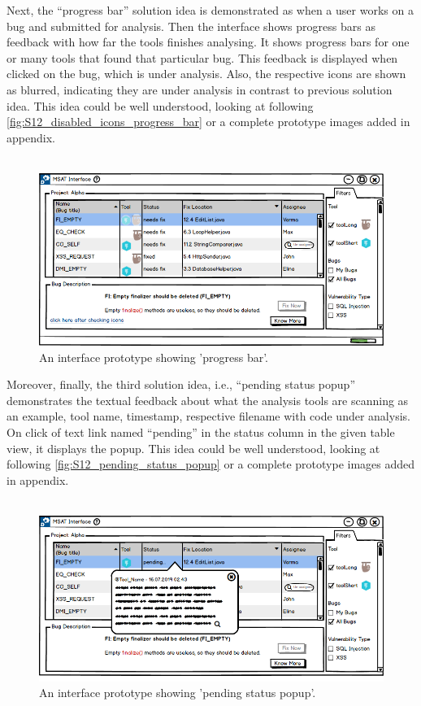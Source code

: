Next, the “progress bar” solution idea is demonstrated as when a user works on a  bug and submitted for analysis.  Then the interface shows progress bars as feedback with how far the tools finishes analysing. It shows progress bars for one or many tools that found that particular bug. This feedback is displayed when clicked on the bug, which is under analysis. Also, the respective icons are shown as blurred, indicating they are under analysis in contrast to previous solution idea. This idea could be well understood, looking at following \autoref{fig:S12_disabled_icons_progress_bar} or a complete prototype images added in appendix. \\ \\


\begin{figure}[hbt!]
	\centering
	\includegraphics[width=\linewidth]{figures/solution_ideas_snaps/S12_disabled_icons_progress_bar}
	\caption{An interface prototype showing 'progress bar'.}
	\label{fig:S12_disabled_icons_progress_bar}
\end{figure}


Moreover, finally, the third solution idea, i.e., “pending status popup” demonstrates the textual feedback about what the analysis tools are scanning as an example, tool name, timestamp, respective filename with code under analysis. On click of text link named “pending” in the status column in the given table view, it displays the popup. This idea could be well understood, looking at following \autoref{fig:S12_pending_status_popup} or a complete prototype images added in appendix. \\ \\


\begin{figure}[hbt!]
	\centering
	\includegraphics[width=\linewidth]{figures/solution_ideas_snaps/S12_pending_status_popup}
	\caption{An interface prototype showing 'pending status popup'.}
	\label{fig:S12_pending_status_popup}
\end{figure}

